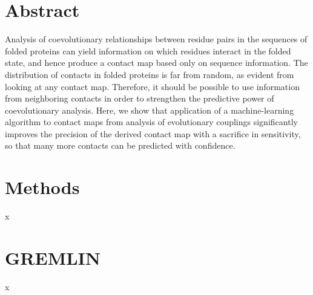 \documentclass[landscape]{sciposter}
\begin{document}
\begin{multicols}{3}

\section*{Abstract}
Analysis of coevolutionary relationships between residue pairs in the sequences of folded proteins can yield information on which residues interact in the folded state, and hence produce a contact map based only on sequence information. 
The distribution of contacts in folded proteins is far from random, as evident from looking at any contact map. 
Therefore, it should be possible to use information from neighboring contacts in order to strengthen the predictive power of coevolutionary analysis. 
Here, we show that application of a machine-learning algorithm to contact maps from analysis of evolutionary couplings significantly improves the precision of the derived contact map with a sacrifice in sensitivity, so that many more contacts can be predicted with confidence. 

\columnbreak

\section*{Methods}
x
\columnbreak

\section*{GREMLIN}
x
\end{multicols}
\end{document}
